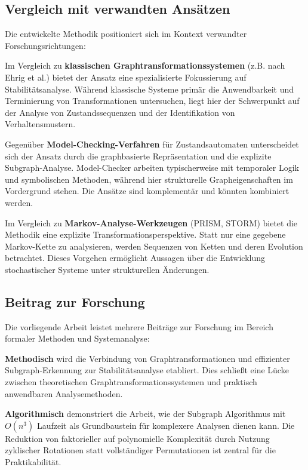 \documentclass[a4paper,12pt]{article}
\theoremstyle{definition}
\begin{document}
\subsection{Vergleich mit verwandten Ansätzen}

Die entwickelte Methodik positioniert sich im Kontext verwandter Forschungsrichtungen:

Im Vergleich zu \textbf{klassischen Graphtransformationssystemen} (z.B. nach Ehrig et al.) bietet der Ansatz eine spezialisierte Fokussierung auf Stabilitätsanalyse. Während klassische Systeme primär die Anwendbarkeit und Terminierung von Transformationen untersuchen, liegt hier der Schwerpunkt auf der Analyse von Zustandssequenzen und der Identifikation von Verhaltensmustern.

Gegenüber \textbf{Model-Checking-Verfahren} für Zustandsautomaten unterscheidet sich der Ansatz durch die graphbasierte Repräsentation und die explizite Subgraph-Analyse. Model-Checker arbeiten typischerweise mit temporaler Logik und symbolischen Methoden, während hier strukturelle Grapheigenschaften im Vordergrund stehen. Die Ansätze sind komplementär und könnten kombiniert werden.

Im Vergleich zu \textbf{Markov-Analyse-Werkzeugen} (PRISM, STORM) bietet die Methodik eine explizite Transformationsperspektive. Statt nur eine gegebene Markov-Kette zu analysieren, werden Sequenzen von Ketten und deren Evolution betrachtet. Dieses Vorgehen ermöglicht Aussagen über die Entwicklung stochastischer Systeme unter strukturellen Änderungen.

\subsection{Beitrag zur Forschung}

Die vorliegende Arbeit leistet mehrere Beiträge zur Forschung im Bereich formaler Methoden und Systemanalyse:

\textbf{Methodisch} wird die Verbindung von Graphtransformationen und effizienter Subgraph-Erkennung zur Stabilitätsanalyse etabliert. Dies schließt eine Lücke zwischen theoretischen Graphtransformationssystemen und praktisch anwendbaren Analysemethoden.

\textbf{Algorithmisch} demonstriert die Arbeit, wie der Subgraph Algorithmus mit $O(n^3)$ Laufzeit als Grundbaustein für komplexere Analysen dienen kann. Die Reduktion von faktorieller auf polynomielle Komplexität durch Nutzung zyklischer Rotationen statt vollständiger Permutationen ist zentral für die Praktikabilität.
\end{document}

